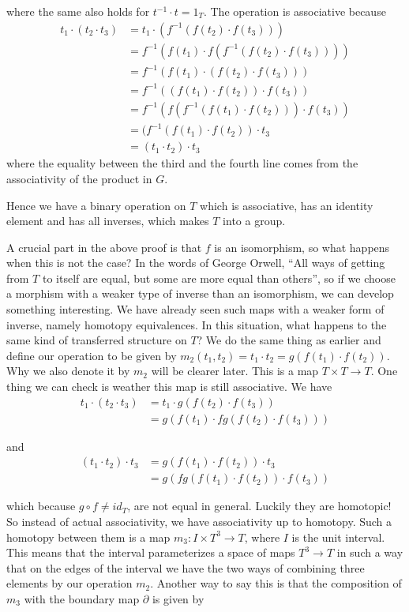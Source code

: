  
where the same also holds for $ t^{-1}\cdot t = 1_T$. The operation is associative because
\begin{align*} 
t_1\cdot (t_2\cdot t_3) 
&= t_1\cdot (f^{-1}(f(t_2)\cdot f(t_3)))\\ 
&= f^{-1}(f(t_1)\cdot f(f^{-1}(f(t_2)\cdot f(t_3)))) \\ 
&= f^{-1}(f(t_1)\cdot (f(t_2)\cdot f(t_3))) \\ 
&= f^{-1}((f(t_1)\cdot f(t_2))\cdot f(t_3)) \\ 
&= f^{-1}(f(f^{-1}(f(t_1)\cdot f(t_2)))\cdot f(t_3)) \\ 
&= (f^{-1}(f(t_1)\cdot f(t_2))\cdot t_3 \\ 
&= (t_1\cdot t_2)\cdot t_3 
\end{align*}
where the equality between the third and the fourth line comes from the associativity of the product in $G$.
 
Hence we have a binary operation on $T$ which is associative, has an identity element and has all inverses, which makes $T$ into a group.

A crucial part in the above proof is that $f$ is an isomorphism, so what happens when this is not the case? In the words of George Orwell, ``All ways of getting from $T$ to itself are equal, but some are more equal than others'', so if we choose a morphism with a weaker type of inverse than an isomorphism, we can develop something interesting. We have already seen such maps with a weaker form of inverse, namely homotopy equivalences. In this situation, what happens to the same kind of transferred structure on $T$? We do the same thing as earlier and define our operation to be given by $m_2(t_1, t_2)=t_1\cdot t_2 = g(f(t_1)\cdot f(t_2))$. Why we also denote it by $ m_2$ will be clearer later. This is a map $ T\times T\longrightarrow T$. One thing we can check is weather this map is still associative. We have
\begin{align*} 
t_1\cdot (t_2 \cdot t_3) 
&= t_1\cdot g(f(t_2)\cdot f(t_3)) \\ 
&= g(f(t_1)\cdot fg(f(t_2)\cdot f(t_3))) 
\end{align*}

and
\begin{align*} 
(t_1\cdot t_2) \cdot t_3 
&= g(f(t_1)\cdot f(t_2)) \cdot t_3\\ 
&= g(fg(f(t_1)\cdot f(t_2))\cdot f(t_3)) 
\end{align*}

which because $ g\circ f \neq id_T$, are not equal in general. Luckily they are homotopic! So instead of actual associativity, we have associativity up to homotopy. Such a homotopy between them is a map $ m_3:I\times T^3\longrightarrow T$, where $ I$ is the unit interval. This means that the interval parameterizes a space of maps $ T^3\longrightarrow T$ in such a way that on the edges of the interval we have the two ways of combining three elements by our operation $ m_2$. Another way to say this is that the composition of $ m_3$ with the boundary map $ \partial$ is given by 

